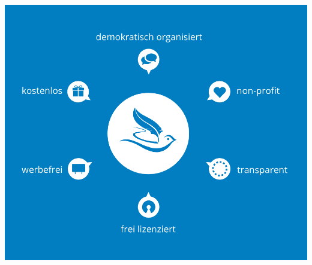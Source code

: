 \documentclass[aspectratio=169]{beamer}
\begin{document}
\begingroup
{}
\begin{frame}
    \centering
    \includegraphics[height=\textheight]{serlo-vision.png}
\end{frame}
\endgroup
\end{document}
